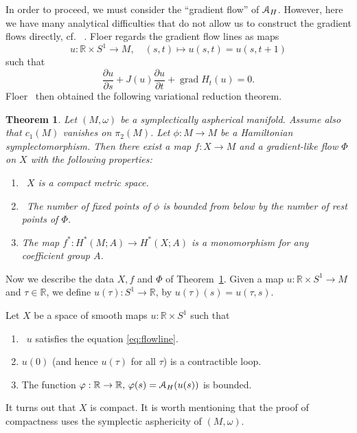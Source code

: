 \documentclass[12pt]{amsart}
\newcommand{\B}[1]{{\mathbb #1}}
\newcommand{\C}[1]{{\EuScript #1}}
\newcommand\R{\B R}
\newtheorem{thm}[subsection]{Theorem}
\numberwithin{equation}{section}
\theoremstyle{definition}
\theoremstyle{remark}
\newcommand\theoref{Theorem~\ref}
\numberwithin{figure}{section}
\numberwithin{table}{section}
\newcommand{\p}{{\partial}}
\newcommand{\om}{{\omega}}
\newcommand{\gf}{{\varphi}}
\newcommand{\Mo}{(M,\omega )}
\newcommand\grad{\operatorname{grad}}
\begin{document}
 
In order to proceed, we must consider the ``gradient flow'' of $\C A_H$.  
However, here we have many analytical difficulties that do not allow us to  
construct the gradient flows directly, cf. ~\cite[Section 6.5]{HZ}.  Floer  
regards the gradient flow lines as maps  
% 
\begin{equation}\label{eq:u} 
u: \R \times S^1\to M,\quad (s,t)\mapsto u(s,t)=u(s,t+1) 
\end{equation} 
% 
such that 
% 
\begin{equation}\label{eq:flowline} 
\frac{\p u}{\p s}+J(u)\frac{\p u}{\p t}+\grad H_t(u)=0. 
\end{equation} 
% 
Floer~\cite{F} then obtained the following variational reduction theorem. 
 
\begin{thm}\label{t:reduction} 
Let $(M,\om)$ be a symplectically aspherical manifold. Assume also that  
$c_1(M)$ vanishes on $\pi_2(M)$. Let $\phi: M \to M$ be a Hamiltonian  
symplectomorphism. Then there exist a map $f: X \to M$ and a gradient-like  
flow $\Phi$ on $X$ with the following properties:  
\begin{enumerate} 
\item~$X$ is a compact metric space. 
\vskip3pt 
\item~The number of fixed points of $\phi$ is bounded from below by the number  
of rest points of $\Phi$. 
\vskip3pt 
\item The map $f^*: H^*(M;A) \to H^*(X;A)$ is a monomorphism for any  
coefficient group $A$. 
\end{enumerate} 
\end{thm}  
 
 
Now we describe the data $X,f$ and $\Phi$ of \theoref{t:reduction}. Given a map  
$u: \R \times S^1\to M$ and $\tau\in \R$, we define $u(\tau): S^1\to \R$, by  
$u(\tau)(s)=u(\tau,s)$.  
 
Let $X$ be a space of smooth maps $u: \R \times S^1$ such that 
% 
\begin{enumerate} 
\item~$u$ satisfies the equation \eqref{eq:flowline}. 
\vskip3pt 
\item $u(0)$ (and hence $u(\tau)$ for all $\tau$) is a contractible loop. 
\vskip3pt 
\item The function $\gf: \R \to \R,\, \gf(s)=\C A_H(u(s))$ is bounded. 
\end{enumerate} 
% 
It turns out  that $X$ is compact. It is worth  mentioning that the proof  
of compactness uses the symplectic asphericity of $\Mo$. 
 
\end{document}
